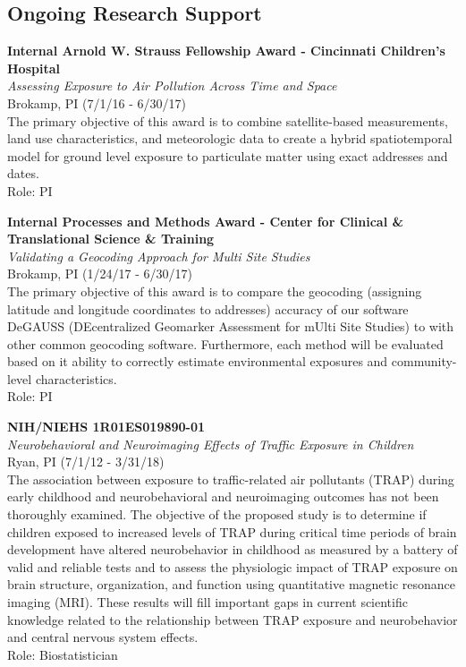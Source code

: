 \documentclass{nihbiosketch}
\begin{document}
\subsection*{Ongoing Research Support}

\bigskip

\textbf{Internal Arnold W. Strauss Fellowship Award - Cincinnati
	Children's Hospital}\\
\emph{Assessing Exposure to Air Pollution Across Time and Space}\\
Brokamp, PI (7/1/16 - 6/30/17)\\
The primary objective of this award is to combine satellite-based
measurements, land use characteristics, and meteorologic data to create
a hybrid spatiotemporal model for ground level exposure to particulate
matter using exact addresses and dates.\\
Role: PI

\bigskip

\textbf{Internal Processes and Methods Award - Center for Clinical \&
	Translational Science \& Training}\\
\emph{Validating a Geocoding Approach for Multi Site Studies}\\
Brokamp, PI (1/24/17 - 6/30/17)\\
The primary objective of this award is to compare the geocoding
(assigning latitude and longitude coordinates to addresses) accuracy of
our software DeGAUSS (DEcentralized Geomarker Assessment for mUlti Site
Studies) to with other common geocoding software. Furthermore, each
method will be evaluated based on it ability to correctly estimate
environmental exposures and community-level characteristics.\\
Role: PI

\bigskip

\textbf{NIH/NIEHS 1R01ES019890-01}\\
\emph{Neurobehavioral and Neuroimaging Effects of Traffic Exposure in
	Children}\\
Ryan, PI (7/1/12 - 3/31/18)\\
The association between exposure to traffic-related air pollutants
(TRAP) during early childhood and neurobehavioral and neuroimaging
outcomes has not been thoroughly examined. The objective of the proposed
study is to determine if children exposed to increased levels of TRAP
during critical time periods of brain development have altered
neurobehavior in childhood as measured by a battery of valid and
reliable tests and to assess the physiologic impact of TRAP exposure on
brain structure, organization, and function using quantitative magnetic
resonance imaging (MRI). These results will fill important gaps in
current scientific knowledge related to the relationship between TRAP
exposure and neurobehavior and central nervous system effects.\\
Role: Biostatistician
\end{document}
